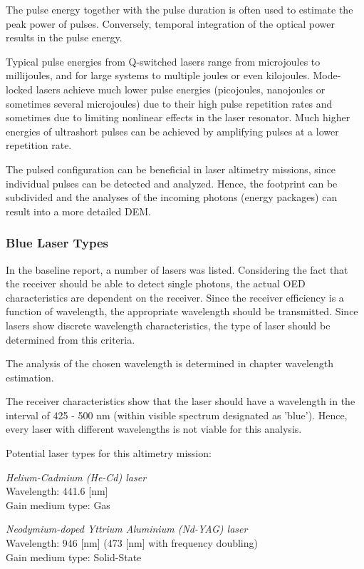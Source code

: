 The pulse energy together with the pulse duration is often used to estimate the peak power of pulses. Conversely, temporal integration of the optical power results in the pulse energy.

Typical pulse energies from Q-switched lasers range from microjoules to millijoules, and for large systems to multiple joules or even kilojoules. Mode-locked lasers achieve much lower pulse energies (picojoules, nanojoules or sometimes several microjoules) due to their high pulse repetition rates and sometimes due to limiting nonlinear effects in the laser resonator. Much higher energies of ultrashort pulses can be achieved by amplifying pulses at a lower repetition rate.

The pulsed configuration can be beneficial in \acs{laser} altimetry missions, since individual pulses can be detected and analyzed. Hence, the footprint can be subdivided and the analyses of the incoming photons (energy packages) can result into a more detailed \acs{DEM}.  

	\subsubsection{Blue Laser Types}
In the baseline report, a number of \acs{laser}s was listed. Considering the fact that the receiver should be able to detect single photons, the actual \acs{OED} characteristics are dependent on the receiver. Since the receiver efficiency is a function of wavelength, the appropriate wavelength should be transmitted. Since \acs{laser}s show discrete wavelength characteristics, the type of \acs{laser} should be determined from this criteria.

The analysis of the chosen wavelength is determined in chapter wavelength estimation.

The receiver characteristics show that the laser should have a wavelength in the interval of 425 - 500 nm (within visible spectrum designated as 'blue'). Hence, every \acs{laser} with different wavelengths is not viable for this analysis.

Potential \acs{laser} types for this altimetry mission:

\textit{Helium-Cadmium (He-Cd) \acs{laser}}\\
Wavelength: 441.6 [nm]\\
Gain medium type: Gas

\textit{Neodymium-doped Yttrium Aluminium (Nd-YAG) \acs{laser}}\\
Wavelength: 946 [nm] (473 [nm] with frequency doubling)\\
Gain medium type: Solid-State

